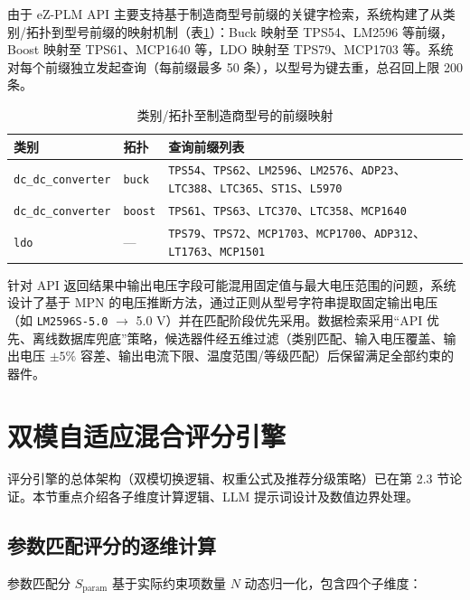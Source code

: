 由于 eZ-PLM API 主要支持基于制造商型号前缀的关键字检索，系统构建了从类别/拓扑到型号前缀的映射机制（表\ref{tab:keywords}）：Buck 映射至 TPS54、LM2596 等前缀，Boost 映射至 TPS61、MCP1640 等，LDO 映射至 TPS79、MCP1703 等。系统对每个前缀独立发起查询（每前缀最多 50 条），以型号为键去重，总召回上限 200 条。

\begin{table}[H]
\centering
\caption{类别/拓扑至制造商型号的前缀映射}
\label{tab:keywords}
\footnotesize
\setlength{\tabcolsep}{4pt}
\renewcommand{\arraystretch}{0.9}
\begin{tabularx}{\textwidth}{p{2.8cm}p{1cm}X}
\toprule
\textbf{类别} & \textbf{拓扑} & \textbf{查询前缀列表} \\
\midrule
\texttt{dc\_dc\_converter} & \texttt{buck} & \texttt{TPS54}、\texttt{TPS62}、\texttt{LM2596}、\texttt{LM2576}、\texttt{ADP23}、\texttt{LTC388}、\texttt{LTC365}、\texttt{ST1S}、\texttt{L5970} \\
\texttt{dc\_dc\_converter} & \texttt{boost} & \texttt{TPS61}、\texttt{TPS63}、\texttt{LTC370}、\texttt{LTC358}、\texttt{MCP1640} \\
\texttt{ldo} & --- & \texttt{TPS79}、\texttt{TPS72}、\texttt{MCP1703}、\texttt{MCP1700}、\texttt{ADP312}、\texttt{LT1763}、\texttt{MCP1501} \\
\bottomrule
\end{tabularx}
\end{table}

针对 API 返回结果中输出电压字段可能混用固定值与最大电压范围的问题，系统设计了基于 MPN 的电压推断方法，通过正则从型号字符串提取固定输出电压（如 \texttt{LM2596S-5.0} $\rightarrow$ 5.0 V）并在匹配阶段优先采用。数据检索采用“API 优先、离线数据库兜底”策略，候选器件经五维过滤（类别匹配、输入电压覆盖、输出电压 $\pm 5\%$ 容差、输出电流下限、温度范围/等级匹配）后保留满足全部约束的器件。


\section{双模自适应混合评分引擎}

评分引擎的总体架构（双模切换逻辑、权重公式及推荐分级策略）已在第 2.3 节论证。本节重点介绍各子维度计算逻辑、LLM 提示词设计及数值边界处理。

\subsection{参数匹配评分的逐维计算}

参数匹配分 $S_{\text{param}}$ 基于实际约束项数量 $N$ 动态归一化，包含四个子维度：


